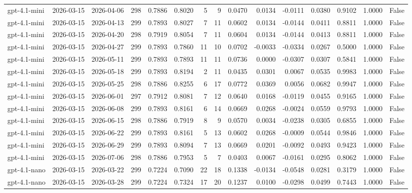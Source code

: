 \begin{table}
\begin{tabular}{lllrrrrrrrrrrrr}
gpt-4.1-mini & 2026-03-15 & 2026-04-06 & 298 & 0.7886 & 0.8020 & 5 & 9 & 0.0470 & 0.0134 & -0.0111 & 0.0380 & 0.9102 & 1.0000 & False \\
gpt-4.1-mini & 2026-03-15 & 2026-04-13 & 299 & 0.7893 & 0.8027 & 7 & 11 & 0.0602 & 0.0134 & -0.0144 & 0.0411 & 0.8811 & 1.0000 & False \\
gpt-4.1-mini & 2026-03-15 & 2026-04-20 & 298 & 0.7919 & 0.8054 & 7 & 11 & 0.0604 & 0.0134 & -0.0144 & 0.0413 & 0.8811 & 1.0000 & False \\
gpt-4.1-mini & 2026-03-15 & 2026-04-27 & 299 & 0.7893 & 0.7860 & 11 & 10 & 0.0702 & -0.0033 & -0.0334 & 0.0267 & 0.5000 & 1.0000 & False \\
gpt-4.1-mini & 2026-03-15 & 2026-05-11 & 299 & 0.7893 & 0.7893 & 11 & 11 & 0.0736 & 0.0000 & -0.0307 & 0.0307 & 0.5841 & 1.0000 & False \\
gpt-4.1-mini & 2026-03-15 & 2026-05-18 & 299 & 0.7893 & 0.8194 & 2 & 11 & 0.0435 & 0.0301 & 0.0067 & 0.0535 & 0.9983 & 1.0000 & False \\
gpt-4.1-mini & 2026-03-15 & 2026-05-25 & 298 & 0.7886 & 0.8255 & 6 & 17 & 0.0772 & 0.0369 & 0.0056 & 0.0682 & 0.9947 & 1.0000 & False \\
gpt-4.1-mini & 2026-03-15 & 2026-06-01 & 297 & 0.7912 & 0.8081 & 7 & 12 & 0.0640 & 0.0168 & -0.0119 & 0.0455 & 0.9165 & 1.0000 & False \\
gpt-4.1-mini & 2026-03-15 & 2026-06-08 & 299 & 0.7893 & 0.8161 & 6 & 14 & 0.0669 & 0.0268 & -0.0024 & 0.0559 & 0.9793 & 1.0000 & False \\
gpt-4.1-mini & 2026-03-15 & 2026-06-15 & 298 & 0.7886 & 0.7919 & 8 & 9 & 0.0570 & 0.0034 & -0.0238 & 0.0305 & 0.6855 & 1.0000 & False \\
gpt-4.1-mini & 2026-03-15 & 2026-06-22 & 299 & 0.7893 & 0.8161 & 5 & 13 & 0.0602 & 0.0268 & -0.0009 & 0.0544 & 0.9846 & 1.0000 & False \\
gpt-4.1-mini & 2026-03-15 & 2026-06-29 & 299 & 0.7893 & 0.8094 & 7 & 13 & 0.0669 & 0.0201 & -0.0092 & 0.0493 & 0.9423 & 1.0000 & False \\
gpt-4.1-mini & 2026-03-15 & 2026-07-06 & 298 & 0.7886 & 0.7953 & 5 & 7 & 0.0403 & 0.0067 & -0.0161 & 0.0295 & 0.8062 & 1.0000 & False \\
gpt-4.1-nano & 2026-03-15 & 2026-03-22 & 299 & 0.7224 & 0.7090 & 22 & 18 & 0.1338 & -0.0134 & -0.0548 & 0.0281 & 0.3179 & 1.0000 & False \\
gpt-4.1-nano & 2026-03-15 & 2026-03-28 & 299 & 0.7224 & 0.7324 & 17 & 20 & 0.1237 & 0.0100 & -0.0298 & 0.0499 & 0.7443 & 1.0000 & False \\

\end{tabular}
\end{table}
